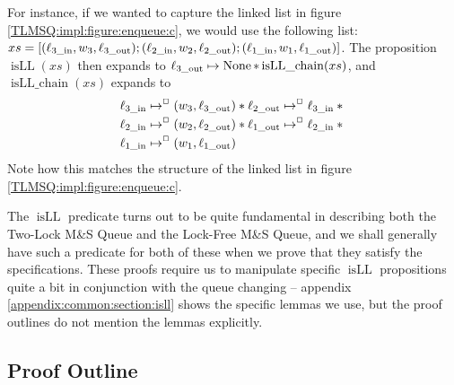 \documentclass[a4paper, 10pt]{report}
\theoremstyle{definition}
\newcommand{\msq}{M\&S Queue}
\newcommand{\tlmsq}{Two-Lock \msq{}}
\newcommand{\lfmsq}{Lock-Free \msq{}}
\newcommand{\xsc}{xs}
\newcommand{\isLLchain}{\operatorname{isLL\_chain}}
\newcommand{\isLL}{\operatorname{isLL}}
\newcommand{\locinM}[1]{\loc_{#1\_\mathrm{in}}}
\newcommand{\locoutM}[1]{\loc_{#1\_\mathrm{out}}}
\newcommand{\nodeval}{\valB}
\newcommand{\nodevalM}[1]{\nodeval_{#1}}
\begin{document}
For instance, if we wanted to capture the linked list in figure \ref{TLMSQ:impl:figure:enqueue:c}, we would use the following list: $\xsc = [(\locinM{3}, \nodevalM{3}, \locoutM{3}); (\locinM{2}, \nodevalM{2}, \locoutM{2});  (\locinM{1}, \nodevalM{1}, \locoutM{1})]$. The proposition $\isLL(\xsc)$ then expands to $\locoutM{3} \mapsto \None \star{} \isLLchain(\xsc)$, and $\isLLchain(\xsc)$ expands to
\begin{align*}
  &\locinM{3} \mapsto^{\persistently} (\nodevalM{3}, \locoutM{3}) \star{} \locoutM{2}	\mapsto^{\persistently} \locinM{3}\star{}\\
  &\locinM{2} \mapsto^{\persistently} (\nodevalM{2}, \locoutM{2}) \star{} \locoutM{1}\mapsto^{\persistently} \locinM{2} \star{}\\
  &\locinM{1} \mapsto^{\persistently} (\nodevalM{1}, \locoutM{1})
\end{align*}
Note how this matches the structure of the linked list in figure \ref{TLMSQ:impl:figure:enqueue:c}.

The $\isLL$ predicate turns out to be quite fundamental in describing both the \tlmsq{} and the \lfmsq{}, and we shall generally have such a predicate for both of these when we prove that they satisfy the specifications. These proofs require us to manipulate specific $\isLL$ propositions quite a bit in conjunction with the queue changing -- appendix \ref{appendix:common:section:isll} shows the specific lemmas we use, but the proof outlines do not mention the lemmas explicitly.

\subsection{Proof Outline}
\label{TLMSQSPECS:sequential:sub:proof-outline}
\end{document}
